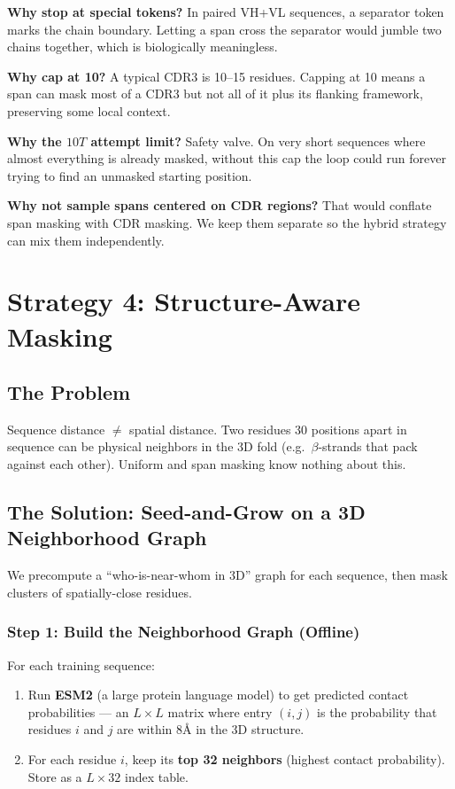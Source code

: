 \documentclass[11pt]{article}
\begin{document}
\textbf{Why stop at special tokens?}
In paired VH+VL sequences, a separator token marks the chain
boundary. Letting a span cross the separator would jumble two
chains together, which is biologically meaningless.

\textbf{Why cap at 10?}
A typical CDR3 is 10--15 residues. Capping at 10 means a span
can mask most of a CDR3 but not all of it plus its flanking
framework, preserving some local context.

\textbf{Why the $10T$ attempt limit?}
Safety valve. On very short sequences where almost everything is
already masked, without this cap the loop could run forever trying
to find an unmasked starting position.

\textbf{Why not sample spans centered on CDR regions?}
That would conflate span masking with CDR masking. We keep them
separate so the hybrid strategy can mix them independently.

\section{Strategy 4: Structure-Aware Masking}
\label{sec:structure}

\subsection{The Problem}
Sequence distance $\neq$ spatial distance. Two residues 30 positions
apart in sequence can be physical neighbors in the 3D fold (e.g.\
$\beta$-strands that pack against each other). Uniform and span
masking know nothing about this.

\subsection{The Solution: Seed-and-Grow on a 3D Neighborhood Graph}
We precompute a ``who-is-near-whom in 3D'' graph for each sequence,
then mask clusters of spatially-close residues.

\subsubsection{Step 1: Build the Neighborhood Graph (Offline)}
For each training sequence:
\begin{enumerate}
\item Run \textbf{ESM2} (a large protein language model) to get
      predicted contact probabilities --- an $L \times L$ matrix
      where entry $(i,j)$ is the probability that residues $i$ and
      $j$ are within 8\AA{} in the 3D structure.
\item For each residue $i$, keep its \textbf{top 32 neighbors}
      (highest contact probability). Store as a $L \times 32$ index
      table.
\end{enumerate}
\end{document}

